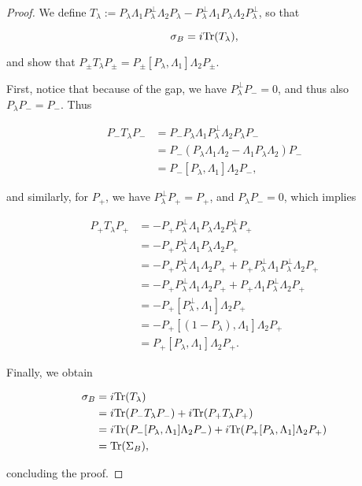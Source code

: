 \documentclass[12pt, letterpaper]{article}
\begin{document}
\begin{proof}
We define $T_\lambda := P_\lambda\Lambda_1 P_\lambda^\perp \Lambda_2P_\lambda -  P_\lambda^\perp \Lambda_1 P_\lambda\Lambda_2P_\lambda^\perp$, so that

\[\sigma_B = i\text{Tr}(T_\lambda),\]

and show that $P_\pm T_\lambda P_\pm = P_\pm [P_\lambda, \Lambda_1]\Lambda_2 P_\pm$. 

First, notice that because of the gap, we have $P_\lambda^\perp P_- = 0$, and thus also $P_\lambda P_- = P_-$. Thus

\[\begin{aligned}
P_- T_\lambda P_- &=  P_-P_\lambda \Lambda_1 P_\lambda^\perp \Lambda_2 P_\lambda P_-\\
&= P_-(P_\lambda\Lambda_1\Lambda_2 - \Lambda_1P_\lambda\Lambda_2)P_-\\
&= P_-[P_\lambda,\Lambda_1]\Lambda_2 P_-,
\end{aligned}\]

and similarly, for $P_+$, we have $P_\lambda^\perp P_+ = P_+$, and $P_\lambda P_- = 0$, which implies

\[\begin{aligned}
P_+ T_\lambda P_+ &=  -P_+P_\lambda^\perp \Lambda_1 P_\lambda \Lambda_2 P_\lambda^\perp P_+\\
&= -P_+P_\lambda^\perp\Lambda_1P_\lambda\Lambda_2P_+\\
&= -P_+P_\lambda^\perp\Lambda_1\Lambda_2P_+ + P_+P_\lambda^\perp\Lambda_1P_\lambda^\perp\Lambda_2P_+\\
&= -P_+P_\lambda^\perp\Lambda_1\Lambda_2P_+ + P_+\Lambda_1P_\lambda^\perp\Lambda_2P_+\\
&= -P_+[P_\lambda^\perp, \Lambda_1]\Lambda_2 P_+\\
&= -P_+[(1-P_\lambda), \Lambda_1]\Lambda_2 P_+\\
&= P_+[P_\lambda, \Lambda_1]\Lambda_2 P_+.
\end{aligned}\]

Finally, we obtain

\[\begin{aligned}
\sigma_B &= i\text{Tr}(T_\lambda) \\
&=  i\text{Tr}(P_-T_\lambda P_-) + i\text{Tr}(P_+T_\lambda P_+)\\
&= i\text{Tr}(P_-[P_\lambda,\Lambda_1]\Lambda_2 P_-) + i\text{Tr}(P_+[P_\lambda, \Lambda_1]\Lambda_2 P_+)\\
&= \text{Tr}(\Sigma_B),
\end{aligned}\]

concluding the proof.
\end{proof}
\end{document}
